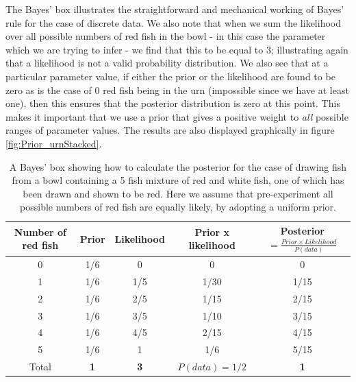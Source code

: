 \documentclass[11pt,fullpage]{book}
\begin{document}
The Bayes' box illustrates the straightforward and mechanical working of Bayes' rule for the case of discrete data. We also note that when we sum the likelihood over all possible numbers of red fish in the bowl - in this case the parameter which we are trying to infer - we find that this to be equal to 3; illustrating again that a likelihood is not a valid probability distribution. We also see that at a particular parameter value, if either the prior or the likelihood are found to be zero as is the case of 0 red fish being in the urn (impossible since we have at least one), then this ensures that the posterior distribution is zero at this point. This makes it important that we use a prior that gives a positive weight to \textit{all} possible ranges of parameter values. The results are also displayed graphically in figure \ref{fig:Prior_urnStacked}.

\begin{table}[htbp]
  \centering
  \caption{A Bayes' box showing how to calculate the posterior for the case of drawing fish from a bowl containing a 5 fish mixture of red and white fish, one of which has been drawn and shown to be red. Here we assume that pre-experiment all possible numbers of red fish are equally likely, by adopting a uniform prior.}\label{tab:Prior_bayesBoxDiscreteUrns}
    \begin{tabular}{ccccc}
    \toprule
    \textbf{Number of red fish} & \textbf{Prior} & \textbf{Likelihood} & \textbf{Prior x likelihood} & \textbf{Posterior$=\frac{Prior\times Likelihood}{P(data)}$} \\
    \midrule
    0     &  1/6  & 0     & 0       & 0       \\
    1     &  1/6  &  1/5  &   1/30 &   1/15 \\
    2     &  1/6  &  2/5  &   1/15 &   2/15 \\
    3     &  1/6  &  3/5  &   1/10 &   3/15  \\
    4     &  1/6  &  4/5  &   2/15 &   4/15 \\
    5     &  1/6  & 1     &   1/6  &   5/15  \\
    \bottomrule
    Total & \textbf{1    } & \textbf{3    } & \textbf{$P(data)=1/2$ } & \textbf{1      } \\
    \bottomrule
    \end{tabular}%
  \label{tab:addlabel}%
\end{table}%
\end{document}

